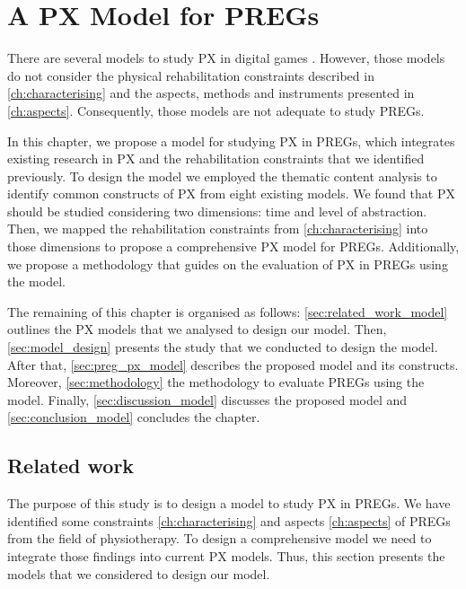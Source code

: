 \chapter{A PX Model for \acp{PREG}}
\label{ch:model}
There are several models to study \ac{PX} in digital games \autocite{Elson2014,Engl2013,Nackea2,Nacked,Fernandez2008,Mayra,DeKort2007b,Ferrara}. However, those models do not consider the physical rehabilitation constraints described in \autoref{ch:characterising} and the aspects, methods and instruments presented in \autoref{ch:aspects}. Consequently, those models are not adequate to study \acp{PREG}.

In this chapter, we propose a model for studying \ac{PX} in \acp{PREG}, which integrates existing research in \ac{PX} and the rehabilitation constraints that we identified previously. To design the model we employed the thematic content analysis to identify common constructs of \ac{PX} from eight existing models. We found that \ac{PX} should be studied considering two dimensions: time and level of abstraction. Then, we mapped the rehabilitation constraints from \autoref{ch:characterising} into those dimensions to propose a comprehensive \ac{PX} model for \acp{PREG}. Additionally, we propose a methodology that guides on the evaluation of \ac{PX} in \acp{PREG} using the model.

The remaining of this chapter is organised as follows: \autoref{sec:related_work_model} outlines the \ac{PX} models that we analysed to design our model. Then, \autoref{sec:model_design} presents the study that we conducted to design the model. After that, \autoref{sec:preg_px_model} describes the proposed model and its constructs. Moreover, \autoref{sec:methodology} the methodology to evaluate \acp{PREG} using the model. Finally, \autoref{sec:discussion_model} discusses the proposed model and \autoref{sec:conclusion_model} concludes the chapter.

\section{Related work} %
\label{sec:related_work_model}
The purpose of this study is to design a model to study \ac{PX} in \acp{PREG}. We have identified some constraints \autoref{ch:characterising} and aspects \autoref{ch:aspects} of \acp{PREG} from the field of physiotherapy. To design a comprehensive model we need to integrate those findings into current \ac{PX} models. Thus, this section presents the models that we considered to design our model.

